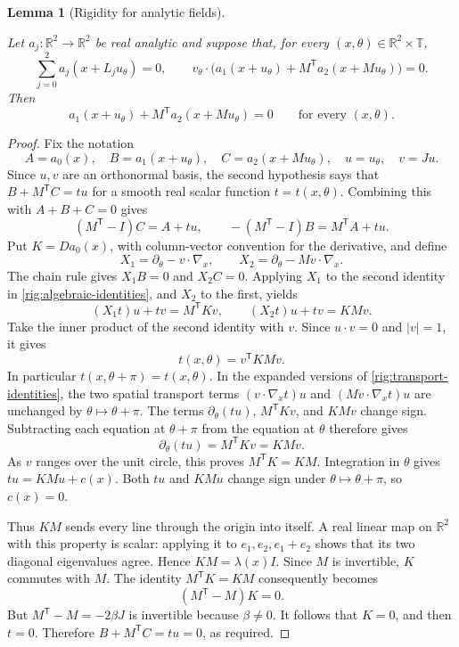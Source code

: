 \documentclass[11pt]{amsart}
\newcommand{\R}{\mathbb R}
\newtheorem{lemma}[theorem]{Lemma}
\theoremstyle{definition}
\theoremstyle{remark}
\numberwithin{equation}{section}
\providecommand{\lean}[1]{}
\providecommand{\leanok}{}
\begin{document}
\begin{lemma}[Rigidity for analytic fields]\label{rig:analytic-rigidity}
\lean{Auto.rig_analytic_rigidity}
\leanok
Let $a_j:\R^2\to\R^2$ be real analytic and suppose that, for every
$(x,\theta)\in\R^2\times \mathbb T$,
\[
 \sum_{j=0}^2a_j(x+L_ju_\theta)=0,
 \qquad
 v_\theta\cdot
 \bigl(a_1(x+u_\theta)+M^{\mathsf T}a_2(x+Mu_\theta)\bigr)=0.
\]
Then
\[
 a_1(x+u_\theta)+M^{\mathsf T}a_2(x+Mu_\theta)=0
 \qquad\text{for every }(x,\theta).
\]
\end{lemma}
\begin{proof}
Fix the notation
\[
 A=a_0(x),\quad B=a_1(x+u_\theta),\quad
 C=a_2(x+Mu_\theta),\quad u=u_\theta,\quad v=Ju.
\]
Since $u,v$ are an orthonormal basis, the second hypothesis says that
$B+M^{\mathsf T}C=tu$ for a smooth real scalar function $t=t(x,\theta)$.
Combining this with $A+B+C=0$ gives
\begin{equation}\label{rig:algebraic-identities}
 (M^{\mathsf T}-I)C=A+tu,
 \qquad -(M^{\mathsf T}-I)B=M^{\mathsf T}A+tu.
\end{equation}
Put $K=Da_0(x)$, with column-vector convention for the derivative,
and define
\[
 X_1=\partial_\theta-v\cdot\nabla_x,
 \qquad X_2=\partial_\theta-Mv\cdot\nabla_x.
\]
The chain rule gives $X_1B=0$ and $X_2C=0$.
Applying $X_1$ to the second identity in
\eqref{rig:algebraic-identities}, and $X_2$ to the first, yields
\begin{equation}\label{rig:transport-identities}
 (X_1t)u+tv=M^{\mathsf T}Kv,
 \qquad (X_2t)u+tv=KMv.
\end{equation}
Take the inner product of the second identity with $v$. Since
$u\cdot v=0$ and $|v|=1$, it gives
\[
 t(x,\theta)=v^{\mathsf T}KMv.
\]
In particular $t(x,\theta+\pi)=t(x,\theta)$.
In the expanded versions of \eqref{rig:transport-identities}, the
two spatial transport terms
$(v\cdot\nabla_xt)u$ and $(Mv\cdot\nabla_xt)u$ are unchanged by
$\theta\mapsto\theta+\pi$. The terms
$\partial_\theta(tu)$, $M^{\mathsf T}Kv$, and $KMv$ change sign.
Subtracting each equation at $\theta+\pi$ from the equation at $\theta$
therefore gives
\[
 \partial_\theta(tu)=M^{\mathsf T}Kv=KMv.
\]
As $v$ ranges over the unit circle, this proves
$M^{\mathsf T}K=KM$. Integration in $\theta$ gives
$tu=KMu+c(x)$. Both $tu$ and $KMu$ change sign under
$\theta\mapsto\theta+\pi$, so $c(x)=0$.

Thus $KM$ sends every line through the origin into itself. A real
linear map on $\R^2$ with this property is scalar: applying it to
$e_1,e_2,e_1+e_2$ shows that its two diagonal eigenvalues agree.
Hence $KM=\lambda(x)I$. Since $M$ is invertible, $K$ commutes with $M$.
The identity $M^{\mathsf T}K=KM$ consequently becomes
\[
 (M^{\mathsf T}-M)K=0.
\]
But $M^{\mathsf T}-M=-2\beta J$ is invertible because $\beta\ne0$.
It follows that $K=0$, and then $t=0$. Therefore
$B+M^{\mathsf T}C=tu=0$, as required.
\end{proof}
\end{document}
